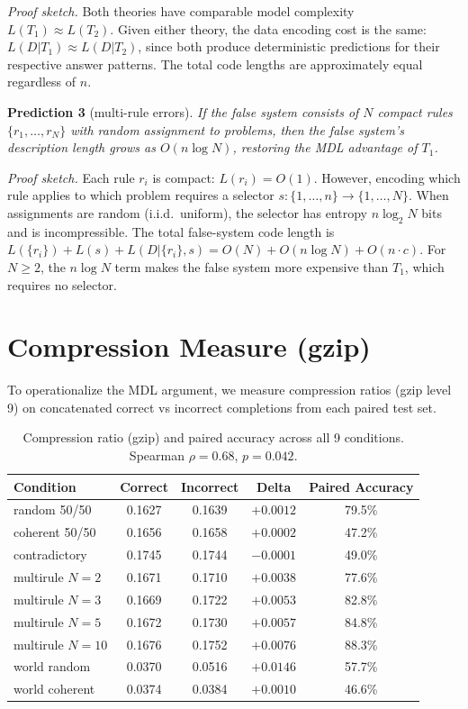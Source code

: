 \documentclass{article}
\begin{document}
\emph{Proof sketch.} Both theories have comparable model complexity $L(T_1) \approx L(T_2)$. Given either theory, the data encoding cost is the same: $L(D|T_1) \approx L(D|T_2)$, since both produce deterministic predictions for their respective answer patterns. The total code lengths are approximately equal regardless of $n$.

\textbf{Prediction 3} (multi-rule errors). \emph{If the false system consists of $N$ compact rules $\{r_1, \ldots, r_N\}$ with random assignment to problems, then the false system's description length grows as $O(n \log N)$, restoring the MDL advantage of $T_1$.}

\emph{Proof sketch.} Each rule $r_i$ is compact: $L(r_i) = O(1)$. However, encoding which rule applies to which problem requires a selector $s: \{1,\ldots,n\} \to \{1,\ldots,N\}$. When assignments are random (i.i.d.\ uniform), the selector has entropy $n \log_2 N$ bits and is incompressible. The total false-system code length is $L(\{r_i\}) + L(s) + L(D|\{r_i\},s) = O(N) + O(n \log N) + O(n \cdot c)$. For $N \geq 2$, the $n \log N$ term makes the false system more expensive than $T_1$, which requires no selector.

\section{Compression Measure (gzip)}
\label{app:compression}

To operationalize the MDL argument, we measure compression ratios (gzip level 9) on concatenated correct vs incorrect completions from each paired test set.

\begin{table}[h]
\centering
\small
\begin{tabular}{lcccc}
\toprule
Condition & Correct & Incorrect & Delta & Paired Accuracy \\
\midrule
random 50/50     & 0.1627 & 0.1639 & $+0.0012$ & 79.5\% \\
coherent 50/50   & 0.1656 & 0.1658 & $+0.0002$ & 47.2\% \\
contradictory    & 0.1745 & 0.1744 & $-0.0001$ & 49.0\% \\
multirule $N{=}2$  & 0.1671 & 0.1710 & $+0.0038$ & 77.6\% \\
multirule $N{=}3$  & 0.1669 & 0.1722 & $+0.0053$ & 82.8\% \\
multirule $N{=}5$  & 0.1672 & 0.1730 & $+0.0057$ & 84.8\% \\
multirule $N{=}10$ & 0.1676 & 0.1752 & $+0.0076$ & 88.3\% \\
world random     & 0.0370 & 0.0516 & $+0.0146$ & 57.7\% \\
world coherent   & 0.0374 & 0.0384 & $+0.0010$ & 46.6\% \\
\bottomrule
\end{tabular}
\caption{Compression ratio (gzip) and paired accuracy across all 9 conditions. Spearman $\rho = 0.68$, $p = 0.042$.}
\label{tab:compression}
\end{table}
\end{document}
